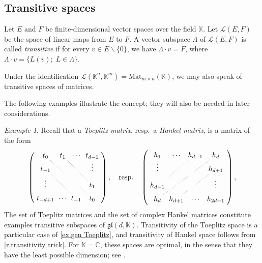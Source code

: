 \documentclass[10pt, a4paper]{amsart}
\theoremstyle{plain}
\theoremstyle{definition}
\theoremstyle{remark}
\theoremstyle{note}
\newtheorem{example}[lemma]{Example}
\numberwithin{equation}{section}
\begin{document}
\subsection{Transitive spaces}\label{ss.transitivity}

Let $E$ and $F$ be finite-dimensional vector spaces over the field ${\mathbb{K}}$.
Let $\mathcal{L}(E,F)$ be the space of linear maps from $E$ to $F$.
A vector subspace $\Lambda$ of $\mathcal{L}(E,F)$ is called \emph{transitive}
if for every $v \in E {\smallsetminus} \{0\}$, we have $\Lambda \cdot v = F$,
where $\Lambda \cdot v = \{ L(v) ; \; L \in \Lambda \}$.

Under the identification $\mathcal{L}({\mathbb{K}}^n, {\mathbb{K}}^m) = {\mathrm{Mat}}_{m \times n}({\mathbb{K}})$,
we may also speak of transitive spaces of matrices.

The following examples illustrate the concept; they will also be needed in later considerations.

\begin{example}\label{ex.toeplitz}
Recall that a \emph{Toeplitz matrix}, resp.\ a \emph{Hankel matrix}, is a matrix of the form
$$
\left(
\vcenter{
\xymatrix @-2pc {
t_0    \ar@{.}[rrrddd] & t_1 \ar@{.}[rrdd] & \cdots & t_{d-1} \\
t_{-1} \ar@{.}[rrdd]   &                   &        & \vdots  \\
\vdots                 &                   &        & t_1     \\
t_{-d+1}               & \cdots            & t_{-1} & t_0
}}
\right) ,
\quad\text{resp.}\quad
\left(
\vcenter{
\xymatrix @-2pc {
h_1       & \cdots  & h_{d-1} \ar@{.}[lldd] & h_d     \ar@{.}[lllddd] \\
\vdots    &         &                       & h_{d+1} \ar@{.}[lldd]   \\
h_{d-1}   &         &                       & \vdots                  \\
h_d       & h_{d+1} & \cdots                & h_{2d-1}
}}
\right),
$$
The set of Toeplitz matrices 
and the set of complex Hankel matrices 
constitute examples transitive subspaces of ${\mathfrak{gl}}(d,{\mathbb{K}})$.
Transitivity of the Toeplitz space is a particular case of \cref{ex.gen Toeplitz},
and transitivity of Hankel space follows from \cref{r.transitivity trick}.
For ${\mathbb{K}} = {\mathbb{C}}$, these spaces are optimal, in the sense that they have the least possible dimension; see \cite{Azoff}.
\end{example}
\end{document}
